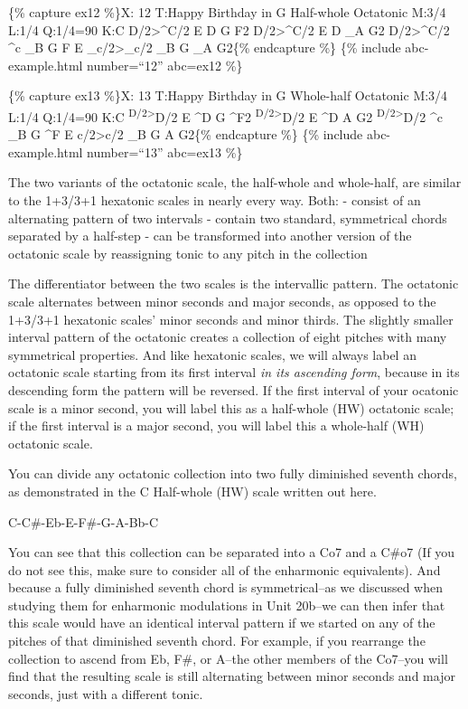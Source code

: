 \documentclass{book}
\begin{document}
\{\% capture ex12 \%\}X: 12 T:Happy Birthday in G Half-whole Octatonic M:3/4
L:1/4 Q:1/4=90 K:C D/2\textgreater\^{}C/2\textbar{} E D G\textbar{} F2
D/2\textgreater\^{}C/2\textbar{} E D \_A\textbar{} G2
D/2\textgreater\^{}C/2\textbar{} \^{}c \_B G\textbar{} F E
\_c/2\textgreater\_c/2\textbar{} \_B G \_A\textbar{} G2\textbar{]}\{\%
endcapture \%\} \{\% include abc-example.html number=``12'' abc=ex12 \%\}

\{\% capture ex13 \%\}X: 13 T:Happy Birthday in G Whole-half Octatonic M:3/4
L:1/4 Q:1/4=90 K:C \textsuperscript{D/2\textgreater{}}D/2\textbar{} E \^{}D
G\textbar{} \^{}F2 \textsuperscript{D/2\textgreater{}}D/2\textbar{} E \^{}D
A\textbar{} G2 \textsuperscript{D/2\textgreater{}}D/2\textbar{} \^{}c \_B
G\textbar{} \^{}F E c/2\textgreater c/2\textbar{} \_B G A\textbar{}
G2\textbar{]}\{\% endcapture \%\} \{\% include abc-example.html number=``13''
abc=ex13 \%\}

The two variants of the octatonic scale, the half-whole and whole-half, are
similar to the 1+3/3+1 hexatonic scales in nearly every way. Both: - consist
of an alternating pattern of two intervals - contain two standard, symmetrical
chords separated by a half-step - can be transformed into another version of
the octatonic scale by reassigning tonic to any pitch in the collection

The differentiator between the two scales is the intervallic pattern. The
octatonic scale alternates between minor seconds and major seconds, as opposed
to the 1+3/3+1 hexatonic scales' minor seconds and minor thirds. The slightly
smaller interval pattern of the octatonic creates a collection of eight
pitches with many symmetrical properties. And like hexatonic scales, we will
always label an octatonic scale starting from its first interval \emph{in its
ascending form}, because in its descending form the pattern will be reversed.
If the first interval of your ocatonic scale is a minor second, you will label
this as a half-whole (HW) octatonic scale; if the first interval is a major
second, you will label this a whole-half (WH) octatonic scale.

You can divide any octatonic collection into two fully diminished seventh
chords, as demonstrated in the C Half-whole (HW) scale written out here.

C-C\#-Eb-E-F\#-G-A-Bb-C

You can see that this collection can be separated into a Co7 and a C\#o7 (If
you do not see this, make sure to consider all of the enharmonic equivalents).
And because a fully diminished seventh chord is symmetrical--as we discussed
when studying them for enharmonic modulations in Unit 20b--we can then infer
that this scale would have an identical interval pattern if we started on any
of the pitches of that diminished seventh chord. For example, if you rearrange
the collection to ascend from Eb, F\#, or A--the other members of the Co7--you
will find that the resulting scale is still alternating between minor seconds
and major seconds, just with a different tonic.
\end{document}
